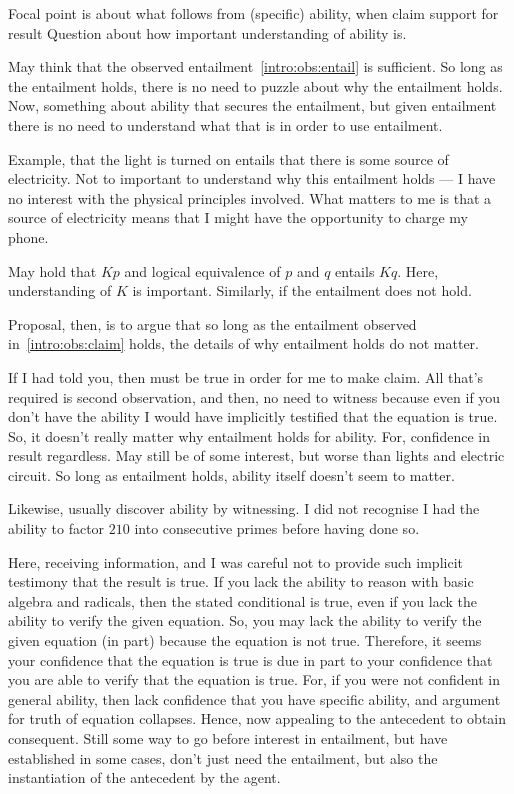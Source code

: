 \begin{note}
  Focal point is about what follows from (specific) ability, when claim support for result
  Question about how important understanding of ability is.

  May think that the observed entailment~\ref{intro:obs:entail} is sufficient.
  So long as the entailment holds, there is no need to puzzle about why the entailment holds.
  Now, something about ability that secures the entailment, but given entailment there is no need to understand what that is in order to use entailment.

  Example, that the light is turned on entails that there is some source of electricity.
  Not to important to understand why this entailment holds --- I have no interest with the physical principles involved.
  What matters to me is that a source of electricity means that I might have the opportunity to charge my phone.

  May hold that \(Kp\) and logical equivalence of \(p\) and \(q\) entails \(Kq\).
  Here, understanding of \(K\) is important.
  Similarly, if the entailment does not hold.

  Proposal, then, is to argue that so long as the entailment observed in~\ref{intro:obs:claim} holds, the details of why entailment holds do not matter.

  If I had told you, then must be true in order for me to make claim.
  All that's required is second observation, and then, no need to witness because even if you don't have the ability I would have implicitly testified that the equation is true.
  So, it doesn't really matter why entailment holds for ability.
  For, confidence in result regardless.
  May still be of some interest, but worse than lights and electric circuit.
  So long as entailment holds, ability itself doesn't seem to matter.

  Likewise, usually discover ability by witnessing.
  I did not recognise I had the ability to factor \(210\) into consecutive primes before having done so.

  Here, receiving information, and I was careful not to provide such implicit testimony that the result is true.
  If you lack the ability to reason with basic algebra and radicals, then the stated conditional is true, even if you lack the ability to verify the given equation.
  So, you may lack the ability to verify the given equation (in part) because the equation is not true.
  Therefore, it seems your confidence that the equation is true is due in part to your confidence that you are able to verify that the equation is true.
  For, if you were not confident in general ability, then lack confidence that you have specific ability, and argument for truth of equation collapses.
  Hence, now appealing to the antecedent to obtain consequent.
  Still some way to go before interest in entailment, but have established in some cases, don't just need the entailment, but also the instantiation of the antecedent by the agent.
\end{note}

